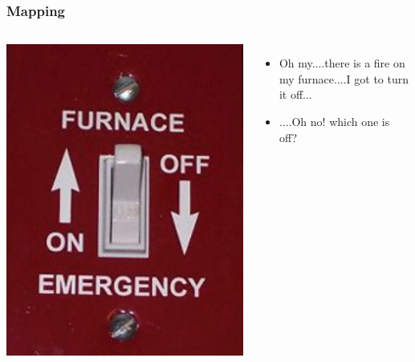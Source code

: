 \documentclass{beamer}
\begin{document}
\begin{frame}
\frametitle{Mapping}
\begin{columns}[c] %
	
	\centering
	\includegraphics[width=1\linewidth]{switch}\newline
	
	\begin{itemize}
		\item Oh my....there is a fire on my furnace....I got to turn it off...
		\item ....Oh no!  which one is off?
	\end{itemize}
\end{columns}
\end{frame}
\end{document}

